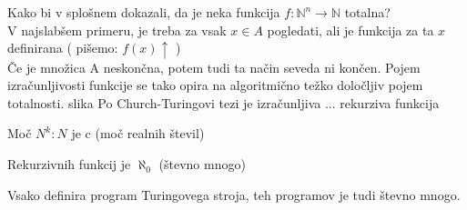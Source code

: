 \documentclass[10pt,a4paper,oneside]{book}
\begin{document}
\begin{neurejeno}
Kako bi v splošnem dokazali, da je neka funkcija $f:\mathbb{N}^n\rightarrow\mathbb{N}$ totalna?\\
V najslabšem primeru, je treba za vsak $x\in A$ pogledati, ali je funkcija za ta $x$ definirana ( pišemo: $f(x)\uparrow$ )\\
Če je množica A neskončna, potem tudi ta način seveda ni končen.
Pojem izračunljivosti funkcije se tako opira na algoritmično težko določljiv pojem totalnosti.
\br
\todo slika %
\br
Po Church-Turingovi tezi je izračunljiva ... rekurziva funkcija %
\begin{items}
\item Moč $N^k:N$ je c (moč realnih števil)%
\item Rekurzivnih funkcij je $\aleph_0$ (števno mnogo)
\item Vsako definira program Turingovega stroja, teh programov je tudi števno mnogo.
\end{items}
\end{neurejeno}
\end{document}
